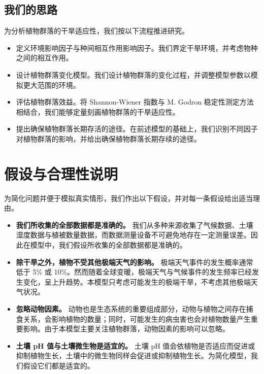 \documentclass[11pt,a4paper]{ctexart}
\begin{document}
\subsection{我们的思路}

为分析植物群落的干旱适应性，我们按以下流程推进研究。

\begin{itemize}
\item 定义环境影响因子与种间相互作用影响因子。我们界定干旱环境，并考虑物种之间的相互作用。
\item 设计植物群落变化模型。我们设计植物群落的变化过程，并调整模型参数以模拟更大范围的环境。
\item 评估植物群落效益。将 Shannon-Wiener 指数与 M. Godron 稳定性测定方法相结合，我们能够定量刻画植物群落的干旱适应性。
\item 提出确保植物群落长期存活的途径。在前述模型的基础上，我们识别不同因子对植物群落的影响，并给出确保植物群落长期存续的途径。
\end{itemize}

\section{假设与合理性说明}

为简化问题并便于模拟真实情形，我们作出以下假设，并对每一条假设给出适当理由。

\begin{itemize}
\item \textbf{我们所收集的全部数据都是准确的。} 我们从多种来源收集了气候数据、土壤湿度数据与植被数量数据，而数据测量设备不可避免地存在一定测量误差。因此在模型中，我们假设所收集的全部数据都是准确的。

\item \textbf{除干旱之外，植物不受其他极端天气的影响。} 极端天气事件的发生概率通常低于 5\% 或 10\%。然而随着全球变暖，极端天气与气候事件的发生频率已经发生变化，呈上升趋势。本模型只考虑可能发生的极端干旱，不考虑其他极端天气状况。

\item \textbf{忽略动物因素。} 动物也是生态系统的重要组成部分，动物与植物之间存在捕食关系，会影响植物的数量；同时，可能发生的病虫害也会对植物数量产生重要影响。由于本模型主要关注植物群落，动物因素的影响可以忽略。

\item \textbf{土壤 pH 值与土壤微生物是适宜的。} 土壤 pH 值会依植物是否适应而促进或抑制植物生长，土壤中的微生物同样会促进或抑制植物生长。为简化模型，我们假设它们都是适宜的。
\end{itemize}
\end{document}

